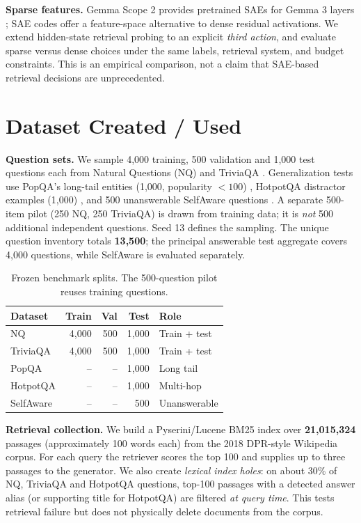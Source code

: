 \documentclass[11pt,a4paper,twocolumn]{article}
\begin{document}
\textbf{Sparse features.} Gemma Scope 2 provides pretrained SAEs for Gemma 3 layers \cite{gemmascope2}; SAE codes offer a feature-space alternative to dense residual activations. We extend hidden-state retrieval probing to an explicit \emph{third action}, and evaluate sparse versus dense choices under the same labels, retrieval system, and budget constraints. This is an empirical comparison, not a claim that SAE-based retrieval decisions are unprecedented.

\section{Dataset Created / Used}
\textbf{Question sets.} We sample 4,000 training, 500 validation and 1,000 test questions each from Natural Questions (NQ) \cite{kwiatkowski2019nq} and TriviaQA \cite{joshi2017trivia}. Generalization tests use PopQA's long-tail entities (1,000, popularity $<100$) \cite{mallen2023pop}, HotpotQA distractor examples (1,000) \cite{yang2018hotpot}, and 500 unanswerable SelfAware questions \cite{selfaware}. A separate 500-item pilot (250 NQ, 250 TriviaQA) is drawn from training data; it is \emph{not} 500 additional independent questions. Seed 13 defines the sampling. The unique question inventory totals \textbf{13,500}; the principal answerable test aggregate covers 4,000 questions, while SelfAware is evaluated separately.

\begin{table}[tbp]\centering\small
\setlength{\tabcolsep}{4.5pt}
\begin{tabular}{@{}lrrrl@{}}\toprule
\textbf{Dataset}&\textbf{Train}&\textbf{Val}&\textbf{Test}&\textbf{Role}\\\midrule
NQ&4,000&500&1,000&Train + test\\
TriviaQA&4,000&500&1,000&Train + test\\
PopQA&--&--&1,000&Long tail\\
HotpotQA&--&--&1,000&Multi-hop\\
SelfAware&--&--&500&Unanswerable\\\bottomrule
\end{tabular}
\caption{Frozen benchmark splits. The 500-question pilot reuses training questions.}\label{tab:data}
\end{table}

\textbf{Retrieval collection.} We build a Pyserini/Lucene BM25 index over \textbf{21,015,324} passages (approximately 100 words each) from the 2018 DPR-style Wikipedia corpus. For each query the retriever scores the top 100 and supplies up to three passages to the generator. We also create \emph{lexical index holes}: on about 30\% of NQ, TriviaQA and HotpotQA questions, top-100 passages with a detected answer alias (or supporting title for HotpotQA) are filtered \emph{at query time}. This tests retrieval failure but does not physically delete documents from the corpus.
\end{document}

